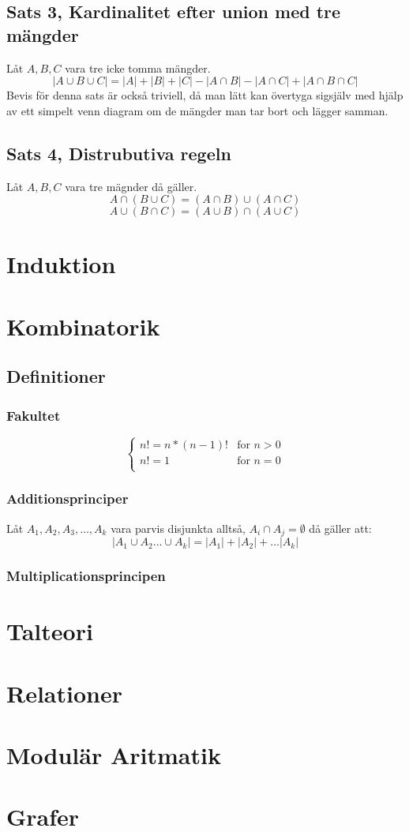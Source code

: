 \documentclass{article}
\begin{document}
	\subsection{Sats 3, Kardinalitet efter union med tre mängder}
	Låt $A, B, C$ vara tre icke tomma mängder.
	$$ |A \cup B \cup C| = |A| + |B| + |C| - |A \cap B| - |A \cap C| + |A \cap B \cap C| $$
	Bevis för denna sats är också triviell, då man lätt kan övertyga sigsjälv med hjälp av ett simpelt venn diagram om de mängder man tar bort och lägger samman. 

	\subsection{Sats 4, Distrubutiva regeln}
	Låt $A, B, C$ vara tre mägnder då gäller. 
	$$ A \cap (B \cup C) = (A \cap B) \cup (A \cap C) $$
	$$ A \cup (B \cap C) = (A \cup B) \cap (A \cup C) $$
	\newpage
		
	\section{Induktion}

	\section{Kombinatorik}
	\subsection{Definitioner}
	\subsubsection{Fakultet}
	$$
	\begin{cases}
		n! = n * (n - 1)! & \text{for }n > 0\\    
		n! = 1 & \text{for } n = 0\\
	\end{cases}
	$$
	\subsubsection{Additionsprinciper}
	Låt $A_1, A_2, A_3, \dots ,A_k$ vara parvis disjunkta alltså, $A_i \cap A_j = \emptyset$ då gäller att:
	$$
		|A_1 \cup A_2 \dots \cup A_k| = |A_1| + |A_2| + \dots |A_k|
	$$
	\subsubsection{Multiplicationsprincipen}


	\section{Talteori}

	\section{Relationer}

	\section{Modulär Aritmatik}

	\section{Grafer}
\end{document}
